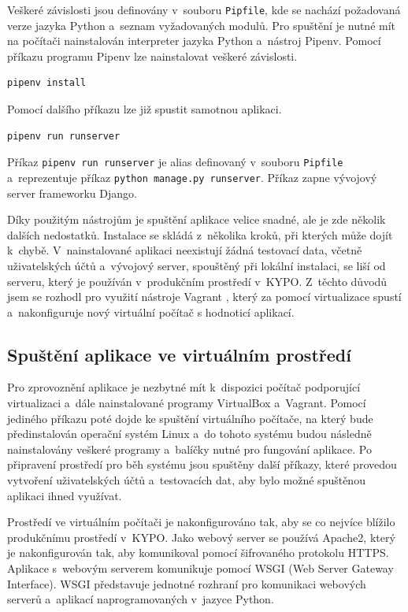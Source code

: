 \documentclass[
  digital,
  twoside,
  table, 
  nolof, 
  nolot
]{fithesis3}
\begin{document}
Veškeré závislosti jsou definovány v~souboru \texttt{Pipfile}, kde se nachází požadovaná verze jazyka Python a~seznam vyžadovaných modulů. Pro spuštění je nutné mít na počítači nainstalován interpreter jazyka Python a~nástroj Pipenv. Pomocí příkazu programu Pipenv lze nainstalovat veškeré závislosti.

\begin{lstlisting}
pipenv install
\end{lstlisting}

\noindent
Pomocí dalšího příkazu lze již spustit samotnou aplikaci.

\begin{lstlisting}
pipenv run runserver
\end{lstlisting}

Příkaz \lstinline[columns=fixed]{pipenv run runserver} je alias definovaný v~souboru \texttt{Pipfile} a~reprezentuje příkaz \lstinline[columns=fixed]{python manage.py runserver}. Příkaz zapne vývojový server frameworku Django.

Díky použitým nástrojům je spuštění aplikace velice snadné, ale je zde několik dalších nedostatků. Instalace se skládá z~několika kroků, při kterých může dojít k~chybě. V~nainstalované aplikaci neexistují žádná testovací data, včetně uživatelských účtů a~vývojový server, spouštěný při lokální instalaci, se liší od serveru, který je používán v~produkčním prostředí v~KYPO. Z~těchto důvodů jsem se rozhodl pro využití nástroje Vagrant \cite{vagrant}, který za pomocí virtualizace spustí a~nakonfiguruje nový virtuální počítač s hodnoticí aplikací.

\subsection{Spuštění aplikace ve virtuálním prostředí}

Pro zprovoznění aplikace je nezbytné mít k~dispozici počítač podporující virtualizaci a~dále nainstalované programy VirtualBox \cite{virtualbox} a~Vagrant. Pomocí jediného příkazu poté dojde ke spuštění virtuálního počítače, na který bude předinstalován operační systém Linux a~do tohoto systému budou následně nainstalovány veškeré programy a~balíčky nutné pro fungování aplikace. Po připravení prostředí pro běh systému jsou spuštěny další příkazy, které provedou vytvoření uživatelských účtů a~testovacích dat, aby bylo možné spuštěnou aplikaci ihned využívat. 

Prostředí ve virtuálním počítači je nakonfigurováno tak, aby se co nejvíce blížilo produkčnímu prostředí v~KYPO. Jako webový server se používá Apache2, který je nakonfigurován tak, aby komunikoval pomocí šifrovaného protokolu HTTPS. Aplikace s~webovým serverem komunikuje pomocí WSGI (Web Server Gateway Interface). WSGI představuje jednotné rozhraní pro komunikaci webových serverů a~aplikací naprogramovaných v~jazyce Python.
\end{document}
